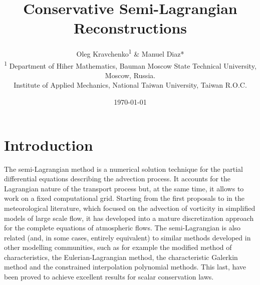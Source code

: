 \documentclass[10pt,a4paper]{article}
\begin{document}
\title{Conservative Semi-Lagrangian Reconstructions}
\author{Oleg Kravchenko\textsuperscript{1} \& Manuel Diaz* \\ 
\small \textsuperscript{1} Department of Hiher Mathematics, Bauman Moscow State Technical University, Moscow, Russia. \\[-3mm]
\small * Institute of Applied Mechanics, National Taiwan University, Taiwan R.O.C.}
\date{\today}

\maketitle


\section{Introduction}

%
%
%
%

The semi-Lagrangian method is a numerical solution technique for the partial differential equations describing the advection process. It accounts for the Lagrangian nature of the transport process but, at the same time, it allows to work on a fixed computational grid. Starting from the first proposals to in the meteorological literature, which focused on the advection of vorticity in simplified models of large scale flow, it has developed into a mature discretization approach for the complete equations of atmospheric flows. The semi-Lagrangian is also related (and, in some cases, entirely equivalent) to similar methods developed in other modelling communities, such as for example the modified method of characteristics, the Eulerian-Lagrangian method, the characteristic Galerkin method and the constrained interpolation polynomial methods. This last, have been proved to achieve excellent results for scalar conservation laws.
%
\end{document}
